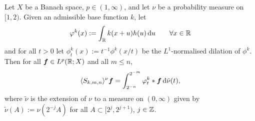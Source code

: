 {\begin{prop}\label{prop:shift-average-repn}
  Let $X$ be a Banach space, $p \in (1,\infty)$, and let $\nu$ be a probability measure on $[1,2)$.
  Given an admissible base function $k$, let
  \begin{equation}\label{eq:phik}
    \varphi^{k}(x) := \int_{\mathbb{R}} k(x+u)h(u) \, \mathrm{d} u \qquad \forall x \in \mathbb{R}
  \end{equation}
  and for all $t > 0$ let $\phi^{k}_{t}(x) := t^{-1}\phi^{k}(x/t)$ be the $L^1$-normalised dilation of $\phi^{k}$.
  Then for all $\bm{f} \in L^p(\mathbb{R};X)$ and all $m \leq n$,
  \begin{equation*}
    \langle S_{k,m,n} \rangle^{\nu} \bm{f} = \int_{2^{-n}}^{2^{-m}} \varphi_{t}^{k} \ast \bm{f} \, \mathrm{d}\tilde{\nu}(t),
  \end{equation*}
  where $\tilde{\nu}$ is the extension of $\nu$ to a measure on $(0,\infty)$ given by $\tilde{\nu}(A) := \nu(2^{-j}A)$ for all $A \subset [2^{j},2^{j+1})$, $j \in \mathbb{Z}$.
\end{prop}

}

